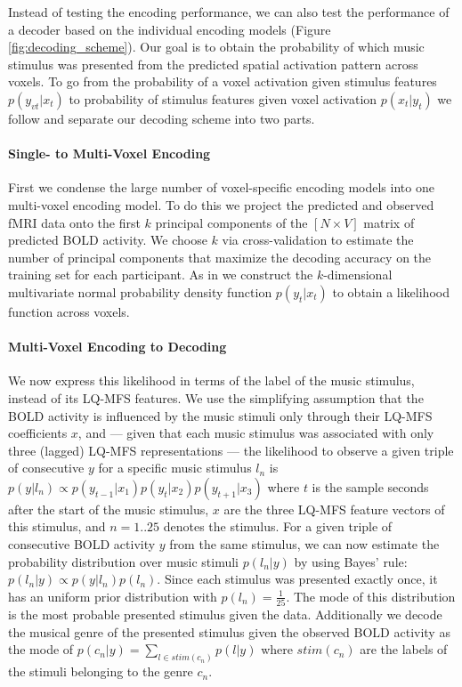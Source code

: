Instead of testing the encoding performance, we can also test the performance of a decoder based on the individual encoding models \citep{NG11} (Figure \ref{fig:decoding_scheme}). Our goal is to obtain the probability of which music stimulus was presented from the predicted spatial activation pattern across voxels. To go from the probability of a voxel activation given stimulus features $p(y_{vt}|x_{t})$ to probability of stimulus features given voxel activation $p(x_{t}|y_{t})$ we follow \citet{NG09} and separate our decoding scheme into two parts. 

\paragraph{Single- to Multi-Voxel Encoding}

First we condense the large number of voxel-specific encoding models into one multi-voxel encoding model.  To do this we project the predicted and observed f{MRI} data onto the first $k$ principal components of the $[N\times V]$ matrix of predicted BOLD activity. We choose $k$ via cross-validation to estimate the number of principal components that maximize the decoding accuracy on the training set for each participant. As in \citet{NG09} we construct the $k$-dimensional multivariate normal probability density function $p(y_{t}|x_{t})$ to obtain a likelihood function across voxels. 

\paragraph{Multi-Voxel Encoding to Decoding}

We now express this likelihood in terms of the label of the music stimulus, instead of its LQ-MFS features. We use the simplifying assumption that the BOLD activity is influenced by the music stimuli only through their LQ-MFS coefficients $x$, and --- given that each music stimulus was associated with only three (lagged) LQ-MFS representations --- the likelihood to observe a given triple of consecutive $y$ for a specific music stimulus $l_{n}$ is $p(y|l_{n}) \propto p(y_{t-1}|x_{1})p(y_{t}|x_{2})p(y_{t+1}|x_{3})$ where $t$ is the sample \unit[6]{seconds} after the start of the music stimulus, $x$ are the three LQ-MFS feature vectors of this stimulus, and $n=1..25$ denotes the stimulus. For a given triple of consecutive BOLD activity $y$ from the same stimulus, we can now estimate the probability distribution over music stimuli $p(l_{n}|y)$  by using Bayes' rule: $p(l_{n}|y) \propto p(y|l_{n})p(l_{n})$. Since each stimulus was presented exactly once, it has an uniform prior distribution with $p(l_{n})=\frac{1}{25}$. The mode of this distribution is the most probable presented stimulus given the data.
Additionally we decode the musical genre of the presented stimulus given the observed BOLD activity as the mode of $p(c_{n}|y) = \sum\nolimits_{l \in  stim(c_{n})} p(l|y)$ where $stim(c_{n})$ are the labels of the stimuli   belonging to the genre $c_{n}$.

